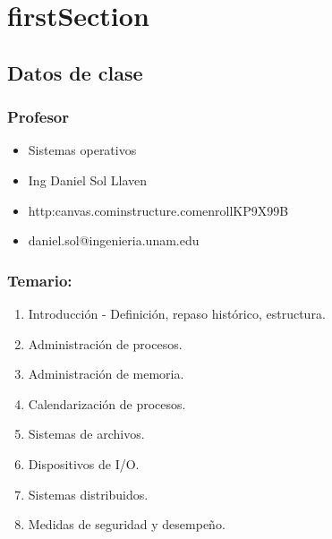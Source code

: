 \newpage
\part{\acrlong{firstSection}}
\chapter{Datos de clase}
\section{Profesor}
\begin{itemize}
	\item Sistemas operativos
	\item Ing Daniel Sol Llaven
	\item http:\/\/canvas.com\/instructure.com\/enroll\/KP9X99B
	\item daniel.sol@ingenieria.unam.edu
\end{itemize}

\section{Temario:}
\begin{enumerate}
	\item Introducci\'{o}n - Definici\'{o}n, repaso hist\'{o}rico, estructura.
	\item Administraci\'{o}n de procesos. %
	\item Administraci\'{o}n de memoria.
	\item Calendarizaci\'{o}n de procesos.
	\item Sistemas de archivos.
	\item Dispositivos de I/O. %
	\item Sistemas distribuidos.
	\item Medidas de seguridad y desempe\~{n}o.
\end{enumerate}
